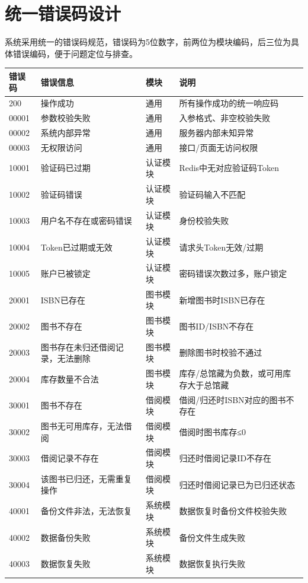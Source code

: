 \documentclass[12pt, a4paper]{article}
\begin{document}
\newpage
\section{统一错误码设计}

系统采用统一的错误码规范，错误码为5位数字，前两位为模块编码，后三位为具体错误编码，便于问题定位与排查。

\begin{table}[H]
    \centering
    \begin{tabularx}{\linewidth}{|l|l|l|X|}
        \hline
        错误码 & 错误信息 & 模块 & 说明 \\
        \hline
        200 & 操作成功 & 通用 & 所有操作成功的统一响应码 \\
        \hline
        00001 & 参数校验失败 & 通用 & 入参格式、非空校验失败 \\
        \hline
        00002 & 系统内部异常 & 通用 & 服务器内部未知异常 \\
        \hline
        00003 & 无权限访问 & 通用 & 接口/页面无访问权限 \\
        \hline
        10001 & 验证码已过期 & 认证模块 & Redis中无对应验证码Token \\
        \hline
        10002 & 验证码错误 & 认证模块 & 验证码输入不匹配 \\
        \hline
        10003 & 用户名不存在或密码错误 & 认证模块 & 身份校验失败 \\
        \hline
        10004 & Token已过期或无效 & 认证模块 & 请求头Token无效/过期 \\
        \hline
        10005 & 账户已被锁定 & 认证模块 & 密码错误次数过多，账户锁定 \\
        \hline
        20001 & ISBN已存在 & 图书模块 & 新增图书时ISBN已存在 \\
        \hline
        20002 & 图书不存在 & 图书模块 & 图书ID/ISBN不存在 \\
        \hline
        20003 & 图书存在未归还借阅记录，无法删除 & 图书模块 & 删除图书时校验不通过 \\
        \hline
        20004 & 库存数量不合法 & 图书模块 & 库存/总馆藏为负数，或可用库存大于总馆藏 \\
        \hline
        30001 & 图书不存在 & 借阅模块 & 借阅/归还时ISBN对应的图书不存在 \\
        \hline
        30002 & 图书无可用库存，无法借阅 & 借阅模块 & 借阅时图书库存≤0 \\
        \hline
        30003 & 借阅记录不存在 & 借阅模块 & 归还时借阅记录ID不存在 \\
        \hline
        30004 & 该图书已归还，无需重复操作 & 借阅模块 & 归还时借阅记录已为已归还状态 \\
        \hline
        40001 & 备份文件非法，无法恢复 & 系统模块 & 数据恢复时备份文件校验失败 \\
        \hline
        40002 & 数据备份失败 & 系统模块 & 备份文件生成失败 \\
        \hline
        40003 & 数据恢复失败 & 系统模块 & 数据恢复执行失败 \\
        \hline
    \end{tabularx}
\end{table}
\end{document}
